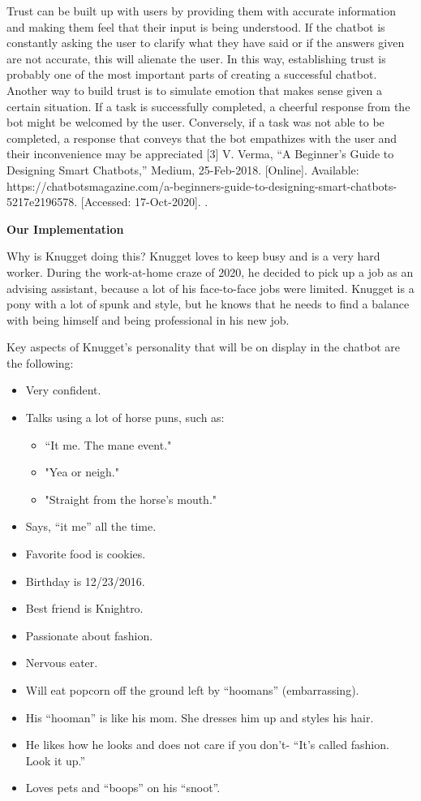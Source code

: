 \documentclass[titlepage, 12pt]{article}
\begin{document}
Trust can be built up with users by providing them with accurate information and making them feel that their input is being understood. If the chatbot is constantly asking the user to clarify what they have said or if the answers given are not accurate, this will alienate the user. In this way, establishing trust is probably one of the most important parts of creating a successful chatbot. Another way to build trust is to simulate emotion that makes sense given a certain situation. If a task is successfully completed, a cheerful response from the bot might be welcomed by the user. Conversely, if a task was not able to be completed, a response that conveys that the bot empathizes with the user and their inconvenience may be appreciated [3] V. Verma, “A Beginner's Guide to Designing Smart Chatbots,” Medium, 25-Feb-2018. [Online]. Available: https://chatbotsmagazine.com/a-beginners-guide-to-designing-smart-chatbots-5217e2196578. [Accessed: 17-Oct-2020]. .

\textbf{Our Implementation}

Why is Knugget doing this? Knugget loves to keep busy and is a very hard worker. During the work-at-home craze of 2020, he decided to pick up a job as an advising assistant, because a lot of his face-to-face jobs were limited. Knugget is a pony with a lot of spunk and style, but he knows that he needs to find a balance with being himself and being professional in his new job.

Key aspects of Knugget’s personality that will be on display in the chatbot are the following:

\begin{itemize}
    \item Very confident.
    \item Talks using a lot of horse puns, such as:
    \begin{itemize}
        \item “It me. The mane event."
        \item "Yea or neigh."
        \item "Straight from the horse's mouth."
    \end{itemize}
    \item Says, “it me” all the time.
    \item Favorite food is cookies.
    \item Birthday is 12/23/2016.
    \item Best friend is Knightro.
    \item Passionate about fashion.
    \item Nervous eater.
    \item Will eat popcorn off the ground left by “hoomans” (embarrassing).
    \item His “hooman” is like his mom. She dresses him up and styles his hair.
    \item He likes how he looks and does not care if you don’t- “It’s called fashion. Look it up.”
    \item Loves pets and “boops” on his “snoot”.
\end{itemize}
\end{document}
